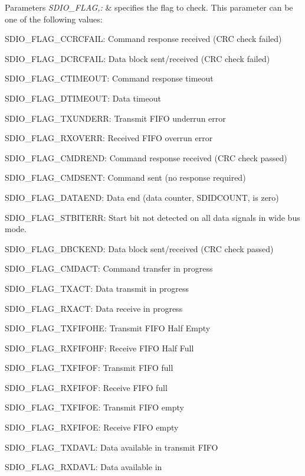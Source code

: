 \begin{DoxyParams}{Parameters}
{\em S\-D\-I\-O\-\_\-\-F\-L\-A\-G,\-:} & specifies the flag to check. This parameter can be one of the following values\-: \begin{DoxyItemize}
\item S\-D\-I\-O\-\_\-\-F\-L\-A\-G\-\_\-\-C\-C\-R\-C\-F\-A\-I\-L\-: Command response received (C\-R\-C check failed) \item S\-D\-I\-O\-\_\-\-F\-L\-A\-G\-\_\-\-D\-C\-R\-C\-F\-A\-I\-L\-: Data block sent/received (C\-R\-C check failed) \item S\-D\-I\-O\-\_\-\-F\-L\-A\-G\-\_\-\-C\-T\-I\-M\-E\-O\-U\-T\-: Command response timeout \item S\-D\-I\-O\-\_\-\-F\-L\-A\-G\-\_\-\-D\-T\-I\-M\-E\-O\-U\-T\-: Data timeout \item S\-D\-I\-O\-\_\-\-F\-L\-A\-G\-\_\-\-T\-X\-U\-N\-D\-E\-R\-R\-: Transmit F\-I\-F\-O underrun error \item S\-D\-I\-O\-\_\-\-F\-L\-A\-G\-\_\-\-R\-X\-O\-V\-E\-R\-R\-: Received F\-I\-F\-O overrun error \item S\-D\-I\-O\-\_\-\-F\-L\-A\-G\-\_\-\-C\-M\-D\-R\-E\-N\-D\-: Command response received (C\-R\-C check passed) \item S\-D\-I\-O\-\_\-\-F\-L\-A\-G\-\_\-\-C\-M\-D\-S\-E\-N\-T\-: Command sent (no response required) \item S\-D\-I\-O\-\_\-\-F\-L\-A\-G\-\_\-\-D\-A\-T\-A\-E\-N\-D\-: Data end (data counter, S\-D\-I\-D\-C\-O\-U\-N\-T, is zero) \item S\-D\-I\-O\-\_\-\-F\-L\-A\-G\-\_\-\-S\-T\-B\-I\-T\-E\-R\-R\-: Start bit not detected on all data signals in wide bus mode. \item S\-D\-I\-O\-\_\-\-F\-L\-A\-G\-\_\-\-D\-B\-C\-K\-E\-N\-D\-: Data block sent/received (C\-R\-C check passed) \item S\-D\-I\-O\-\_\-\-F\-L\-A\-G\-\_\-\-C\-M\-D\-A\-C\-T\-: Command transfer in progress \item S\-D\-I\-O\-\_\-\-F\-L\-A\-G\-\_\-\-T\-X\-A\-C\-T\-: Data transmit in progress \item S\-D\-I\-O\-\_\-\-F\-L\-A\-G\-\_\-\-R\-X\-A\-C\-T\-: Data receive in progress \item S\-D\-I\-O\-\_\-\-F\-L\-A\-G\-\_\-\-T\-X\-F\-I\-F\-O\-H\-E\-: Transmit F\-I\-F\-O Half Empty \item S\-D\-I\-O\-\_\-\-F\-L\-A\-G\-\_\-\-R\-X\-F\-I\-F\-O\-H\-F\-: Receive F\-I\-F\-O Half Full \item S\-D\-I\-O\-\_\-\-F\-L\-A\-G\-\_\-\-T\-X\-F\-I\-F\-O\-F\-: Transmit F\-I\-F\-O full \item S\-D\-I\-O\-\_\-\-F\-L\-A\-G\-\_\-\-R\-X\-F\-I\-F\-O\-F\-: Receive F\-I\-F\-O full \item S\-D\-I\-O\-\_\-\-F\-L\-A\-G\-\_\-\-T\-X\-F\-I\-F\-O\-E\-: Transmit F\-I\-F\-O empty \item S\-D\-I\-O\-\_\-\-F\-L\-A\-G\-\_\-\-R\-X\-F\-I\-F\-O\-E\-: Receive F\-I\-F\-O empty \item S\-D\-I\-O\-\_\-\-F\-L\-A\-G\-\_\-\-T\-X\-D\-A\-V\-L\-: Data available in transmit F\-I\-F\-O \item S\-D\-I\-O\-\_\-\-F\-L\-A\-G\-\_\-\-R\-X\-D\-A\-V\-L\-: Data available in 
\end{DoxyItemize}
\end{DoxyParams}
